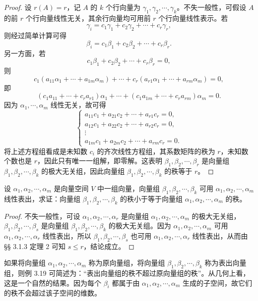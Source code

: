 \documentclass[lang=cn,12pt]{elegantbook}
\begin{document}
\begin{proof}
    设 \(r(A) = r\)，记 \(A\) 的 \(k\) 个行向量为 \(\gamma_1, \gamma_2, \cdots, \gamma_k\)。不失一般性，可假设 \(A\) 的前 \(r\) 个行向量线性无关，其余行向量均可用前 \(r\) 个行向量线性表示。若
    \[
    \gamma_i = c_1\gamma_1 + c_2\gamma_2 + \cdots + c_r\gamma_r,
    \]
    则经过简单计算可得
    \[
    \beta_i = c_1\beta_1 + c_2\beta_2 + \cdots + c_r\beta_r.
    \]
    另一方面，若
    \[
    c_1\beta_1 + c_2\beta_2 + \cdots + c_r\beta_r = 0,
    \]
    则
    \[
    c_1(a_{11}\alpha_1 + \cdots + a_{1m}\alpha_m) + \cdots + c_r(a_{r1}\alpha_1 + \cdots + a_{rm}\alpha_m) = 0,
    \]
    即
    \[
    (c_1a_{11} + \cdots + c_r a_{r1}) \alpha_1 + \cdots + (c_1a_{1m} + \cdots + c_r a_{rm}) \alpha_m = 0.
    \]
    因为 \(\alpha_1, \cdots , \alpha_m\) 线性无关，故可得
    \[
    \begin{cases}
    a_{11}c_1 + a_{21}c_2 + \cdots + a_{r1}c_r = 0, \\
    a_{12}c_1 + a_{22}c_2 + \cdots + a_{r2}c_r = 0, \\
    \vdots \\
    a_{1m}c_1 + a_{2m}c_2 + \cdots + a_{rm}c_r = 0.
    \end{cases}
    \]
    将上述方程组看成是未知数 \(c_i\) 的齐次线性方程组，其系数矩阵的秩为 \(r\)，未知数个数也是 \(r\)，因此只有唯一一组解，即零解。这表明 \(\beta_1, \beta_2, \cdots , \beta_r\) 是向量组 \(\beta_1, \beta_2, \cdots , \beta_k\) 的极大无关组，因此向量组 \(\beta_1, \beta_2, \cdots , \beta_k\) 的秩等于 \(r\)。
    \end{proof}

\begin{example}
        设 \(\alpha_1, \alpha_2, \cdots, \alpha_m\) 是向量空间 \(V\) 中一组向量，向量组 \(\beta_1, \beta_2, \cdots, \beta_k\) 可用 \(\alpha_1, \alpha_2, \cdots, \alpha_m\) 线性表出，求证：向量组 \(\beta_1, \beta_2, \cdots, \beta_k\) 的秩小于等于向量组 \(\alpha_1, \alpha_2, \cdots, \alpha_m\) 的秩。
\end{example}
        
\begin{proof}
    不失一般性，可设 \(\alpha_1, \alpha_2, \cdots, \alpha_r\) 是向量组 \(\alpha_1, \alpha_2, \cdots, \alpha_m\) 的极大无关组，\(\beta_1, \beta_2, \cdots, \beta_s\) 是向量组 \(\beta_1, \beta_2, \cdots, \beta_k\) 的极大无关组。因为 \(\alpha_1, \alpha_2, \cdots, \alpha_m\) 可用 \(\alpha_1, \alpha_2, \cdots, \alpha_r\) 线性表出，所以 \(\beta_1, \beta_2, \cdots, \beta_s\) 也可用 \(\alpha_1, \alpha_2, \cdots, \alpha_r\) 线性表出，从而由 §§ 3.1.3 定理 2 可知 \(s \leq r\)，结论成立。
\end{proof}
\begin{remark}
    如果将向量组 \(\alpha_1, \alpha_2, \cdots, \alpha_m\) 称为原向量组，将向量组 \(\beta_1, \beta_2, \cdots, \beta_k\) 称为表出向量组，则例 3.19 可简述为：“表出向量组的秩不超过原向量组的秩”。从几何上看，这是一个自然的结果。因为每个 \(\beta_i\) 都属于由 \(\alpha_1, \alpha_2, \cdots, \alpha_m\) 生成的子空间，故它们的秩不会超过该子空间的维数。
\end{remark}
\end{document}

